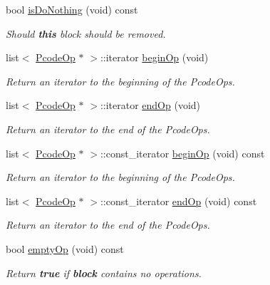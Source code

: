 \begin{DoxyCompactItemize}
bool \mbox{\hyperlink{class_block_basic_a08e48137d2fd9fb3faa9c299516b9581}{is\+Do\+Nothing}} (void) const
\begin{DoxyCompactList}\small\item\em Should {\bfseries{this}} block should be removed. \end{DoxyCompactList}\item 
list$<$ \mbox{\hyperlink{class_pcode_op}{Pcode\+Op}} $\ast$ $>$\+::iterator \mbox{\hyperlink{class_block_basic_a3ddd779a5af8cb12e6fc069bd49ddb6c}{begin\+Op}} (void)
\begin{DoxyCompactList}\small\item\em Return an iterator to the beginning of the Pcode\+Ops. \end{DoxyCompactList}\item 
list$<$ \mbox{\hyperlink{class_pcode_op}{Pcode\+Op}} $\ast$ $>$\+::iterator \mbox{\hyperlink{class_block_basic_abd3fc70635403ddb5c85c07b19c6f6b3}{end\+Op}} (void)
\begin{DoxyCompactList}\small\item\em Return an iterator to the end of the Pcode\+Ops. \end{DoxyCompactList}\item 
list$<$ \mbox{\hyperlink{class_pcode_op}{Pcode\+Op}} $\ast$ $>$\+::const\+\_\+iterator \mbox{\hyperlink{class_block_basic_a79b0dca4faff5ba6eb69c1477c9251eb}{begin\+Op}} (void) const
\begin{DoxyCompactList}\small\item\em Return an iterator to the beginning of the Pcode\+Ops. \end{DoxyCompactList}\item 
list$<$ \mbox{\hyperlink{class_pcode_op}{Pcode\+Op}} $\ast$ $>$\+::const\+\_\+iterator \mbox{\hyperlink{class_block_basic_a06c467f9b7b251aa37781d19da122bd5}{end\+Op}} (void) const
\begin{DoxyCompactList}\small\item\em Return an iterator to the end of the Pcode\+Ops. \end{DoxyCompactList}\item 
bool \mbox{\hyperlink{class_block_basic_aedf26d0f0560d601eb54fb7303518545}{empty\+Op}} (void) const
\begin{DoxyCompactList}\small\item\em Return {\bfseries{true}} if {\bfseries{block}} contains no operations. \end{DoxyCompactList}\end{DoxyCompactItemize}
